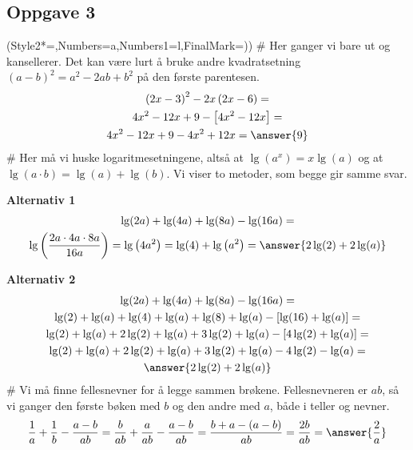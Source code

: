 \subsection*{Oppgave 3}
\begin{easylist}[enumerate]
	\ListProperties(Style2*=,Numbers=a,Numbers1=l,FinalMark={)})
	# Her ganger vi bare ut og kansellerer.
	Det kan være lurt å bruke andre kvadratsetning $(a-b)^2 = a^2 -2ab + b^2$ på den første parentesen.
	\begin{gather*}
		\left( 2x - 3\right)^2 - 2x \left(2x - 6\right) =\\
		4x^2 - 12x + 9 - \left[ 4x^2 - 12x\right] =\\
		4x^2 - 12x + 9 -  4x^2 + 12x = \answer{9}
	\end{gather*}
	# Her må vi huske logaritmesetningene, altså at $\lg (a^x) = x \lg (a)$ og at $\lg \left(a \cdot b\right) = \lg (a) + \lg (b)$.
	Vi viser to metoder, som begge gir samme svar.
	
	\textbf{Alternativ 1}
	\begin{gather*}
	\lg (2a) + \lg (4a) + \lg (8a) - \lg (16a) =\\
	\lg \left( \frac{2a \cdot 4a \cdot 8a}{16a} \right) 
	= 
	\lg \left( 4a^2 \right) =
	\lg (4) + \lg \left( a^2 \right) = \answer{2 \lg (2) + 2 \lg(a)}
	\end{gather*}
	
	\textbf{Alternativ 2}
	\begin{gather*}
		\lg (2a) + \lg (4a) + \lg (8a) - \lg (16a) =\\
		\lg (2) + \lg (a) + \lg (4) + \lg (a) + \lg (8) +\lg (a) - \left[\lg (16) + \lg (a)\right] =\\ 
		\lg (2) + \lg (a) + 2\lg (2) + \lg (a) + 3\lg (2) +\lg (a) - \left[4 \lg (2) + \lg (a)\right] =\\
		\lg (2) + \lg (a) + 2\lg (2) + \lg (a) + 3\lg (2) +\lg (a) - 4 \lg (2) - \lg (a) =\\
		\answer{2 \lg (2) + 2 \lg(a)}
	\end{gather*}
	# Vi må finne fellesnevner for å legge sammen brøkene. Fellesnevneren er $ab$, så vi ganger den første bøken med $b$ og den andre med $a$, både i teller og nevner.
	\begin{equation*}
		\frac{1}{a} + \frac{1}{b} - \frac{a - b}{ab} =
		\frac{b}{ab} + \frac{a}{ab} - \frac{a - b}{ab} =
		\frac{b + a - (a - b)}{ab} =
		\frac{2b}{ab} = \answer{\frac{2}{a}} 
	\end{equation*}
\end{easylist}

